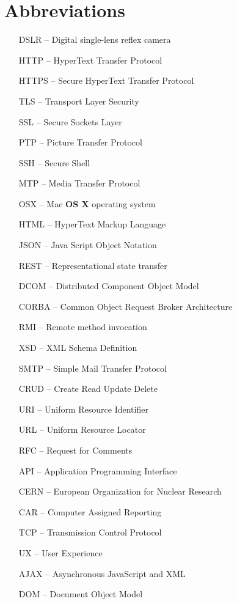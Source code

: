 \section*{Abbreviations}

\begin{itemize}[leftmargin=2cm, topsep=0pt, partopsep=5pt,itemsep=0pt,parsep=0pt]
\item[DSLR --] Digital single-lens reflex camera
\item[HTTP --] HyperText Transfer Protocol
\item[HTTPS --] Secure HyperText Transfer Protocol
\item[TLS --] Transport Layer Security
\item[SSL --] Secure Sockets Layer
\item[PTP --] Picture Transfer Protocol
\item[SSH --] Secure Shell
\item[MTP --] Media Transfer Protocol
\item[OSX --] Mac \textbf{OS X} operating system
\item[HTML --] HyperText Markup Language
\item[JSON --] Java Script Object Notation
\item[REST --] Representational state transfer
\item[DCOM --] Distributed Component Object Model
\item[CORBA --] Common Object Request Broker Architecture
\item[RMI --] Remote method invocation
\item[XSD --] XML Schema Definition
\item[SMTP --] Simple Mail Transfer Protocol
\item[CRUD --] Create Read Update Delete
\item[URI --] Uniform Resource Identifier
\item[URL --] Uniform Resource Locator
\item[RFC --] Request for Comments
\item[API --] Application Programming Interface
\item[CERN --] European Organization for Nuclear Research 
\item[CAR --] Computer Assigned Reporting
\item[TCP --] Transmission Control Protocol
\item[UX --] User Experience
\item[AJAX --] Asynchronous JavaScript and XML
\item[DOM --] Document Object Model

\end{itemize}
